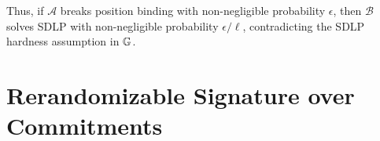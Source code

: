 Thus, if $\mathcal{A}$ breaks position binding with non-negligible probability $\epsilon$, then $\mathcal{B}$ solves SDLP with non-negligible probability $\epsilon/\ell$, contradicting the SDLP hardness assumption in $\mathbb{G}$.





% 
% 















% 
% 
\newpage
\section{Rerandomizable Signature over Commitments}\label{sec:pssignature}

